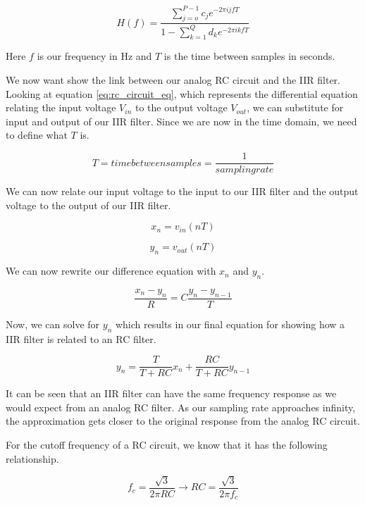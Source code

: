\begin{equation}
H(f)=\frac{\displaystyle\sum\limits_{j=o}^{P-1} c_je^{-2\pi ijfT}}{1-\displaystyle\sum\limits_{k=1}^{Q} d_ke^{-2\pi ikfT}}
\end{equation}

Here $f$ is our frequency in Hz and $T$ is the time between samples in seconds.

We now want show the link between our analog RC circuit and the IIR filter.  Looking at equation \ref{eq:rc_circuit_eq}, which represents the differential equation relating the input voltage $V_{in}$ to the output voltage $V_{out}$, we can substitute for input and output of our IIR filter.  Since we are now in the time domain, we need to define what $T$ is.

\begin{equation}
T=time between samples=\frac{1}{sampling rate}
\end{equation}

We can now relate our input voltage to the input to our IIR filter and the output voltage to the output of our IIR filter.

\begin{equation}
x_n=v_{in}(nT)
\end{equation}

\begin{equation}
y_n=v_{out}(nT)
\end{equation}

We can now rewrite our difference equation with $x_n$ and $y_n$.

\begin{equation}
\frac{x_n-y_n}{R}=C\frac{y_n-y_{n-1}}{T}
\end{equation}

Now, we can solve for $y_n$ which results in our final equation for showing how a IIR filter is related to an RC filter.

\begin{equation}
y_n=\frac{T}{T+RC}x_n+\frac{RC}{T+RC}y_{n-1}
\end{equation}

It can be seen that an IIR filter can have the same frequency response as we would expect from an analog RC filter.  As our sampling rate approaches infinity, the approximation gets closer to the original response from the analog RC circuit.  

For the cutoff frequency of a RC circuit, we know that it has the following relationship.

\begin{equation}
f_c=\frac{\sqrt{3}}{2\pi RC}\rightarrow RC=\frac{\sqrt{3}}{2\pi f_c}
\end{equation}


